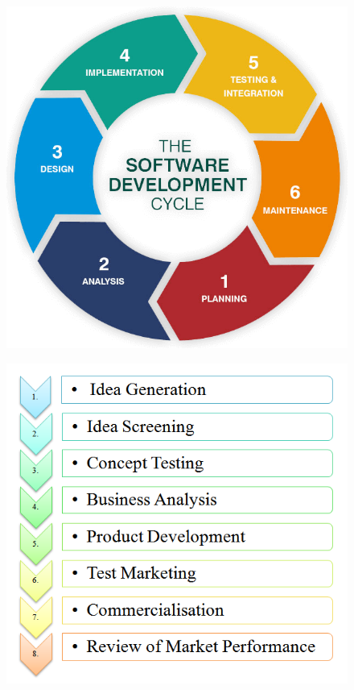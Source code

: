 \documentclass{article}
\begin{document}
\begin{figure}
	\centering
	\begin{minipage}{.4\textwidth}
		\centering
		\includegraphics[height=.75\linewidth]{software-cycle.png}
		\label{fig:test1}
	\end{minipage}%
	\hspace{.5cm}
	\begin{minipage}{.4\textwidth}
		\centering
		\includegraphics[height=.75\linewidth]{product-cycle.png}
		\label{fig:test2}
	\end{minipage}
\end{figure}
\end{document}
